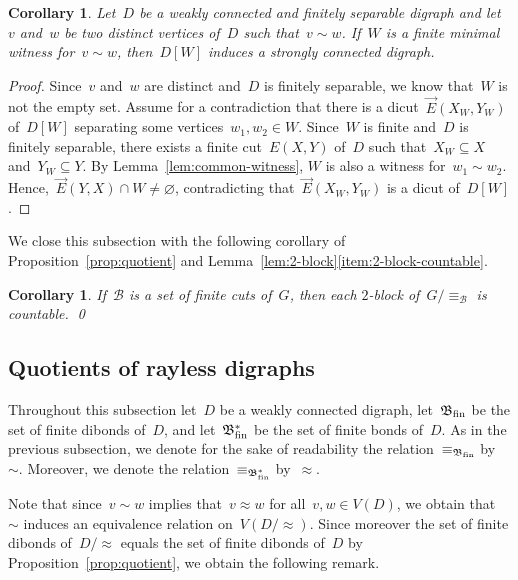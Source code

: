 \documentclass[reqno, 12pt]{amsart}
\numberwithin{equation}{section}
\numberwithin{figure}{section}
\let\emptyset=\varnothing
\theoremstyle{plain}
\newtheorem{corollary}[thm]{Corollary}
\theoremstyle{definition}
\begin{document}
\begin{corollary}
    \label{cor:min-witness-strongly-connected}
    Let~$D$ be a weakly connected and finitely separable digraph and let~$v$ and~$w$ be two distinct vertices of~$D$ such that~${v \sim w}$. 
    If~$W$ is a finite minimal witness for~${v \sim w}$, then~${D[W]}$ induces a strongly connected digraph. 
\end{corollary}

\begin{proof}
    Since~$v$ and~$w$ are distinct and~$D$ is finitely separable, we know that~$W$ is not the empty set. 
    Assume for a contradiction that there is a dicut~${\overrightarrow{E}(X_W,Y_W)}$ of~${D[W]}$ separating some vertices~${w_1, w_2 \in W}$. 
    Since~$W$ is finite and~$D$ is finitely separable, there exists a finite cut~${E(X,Y)}$ of~$D$ such that~${X_W \subseteq X}$ and~${Y_W \subseteq Y}$.
    By Lemma~\ref{lem:common-witness}, $W$ is also a witness for~${w_1 \sim w_2}$. 
    Hence,~${\overrightarrow{E}(Y,X) \cap W \neq \emptyset}$, contradicting that~${\overrightarrow{E}(X_W,Y_W)}$ is a dicut of~${D[W]}$. 
\end{proof}


We close this subsection with the following corollary of Proposition~\ref{prop:quotient} and Lemma~\ref{lem:2-block}\ref{item:2-block-countable}.

\begin{corollary}
    \label{cor:countable_fin-disep_blocks}
    If~$\mathcal{B}$ is a set of finite cuts of~$G$, then each $2$-block of~${G{/}{\equiv_\mathcal{B}}}$ is countable. 
    \qed
\end{corollary}


\subsection{Quotients of rayless digraphs}

Throughout this subsection let~$D$ be a weakly connected digraph, let~$\mathfrak{B}_\textnormal{fin}$ be the set of finite dibonds of~$D$, and
let~$\mathfrak{B}^{\ast}_\textnormal{fin}$ be the set of finite bonds of~$D$. 
As in the previous subsection, we denote for the sake of readability the relation~$\equiv_{\mathfrak{B}_\textnormal{fin}}$ by~$\sim$.
Moreover, we denote the relation~$\equiv_{\mathfrak{B}^{\ast}_\textnormal{fin}}$ by~$\approx$. 

Note that since~${v \sim w}$ implies that~${v \approx w}$ for all~${v, w \in V(D)}$, we obtain that~$\sim$ induces an equivalence relation on~${V(D{/}{\approx})}$. 
Since moreover the set of finite dibonds of~$D{/}{\approx}$ equals the set of finite dibonds of~$D$ by Proposition~\ref{prop:quotient}, we obtain the following remark.
\end{document}
